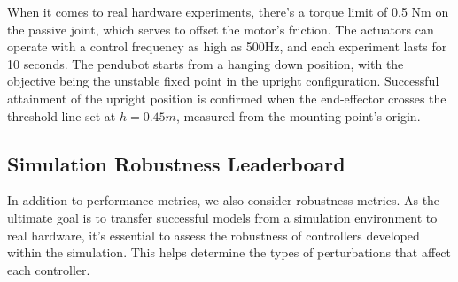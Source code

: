 When it comes to real hardware experiments, there's a torque limit of 0.5 Nm on the passive joint, which serves to offset the motor's friction. The actuators can operate with a control frequency as high as 500Hz, and each experiment lasts for 10 seconds. The pendubot starts from a hanging down position, with the objective being the unstable fixed point in the upright configuration. Successful attainment of the upright position is confirmed when the end-effector crosses the threshold line set at \(h=0.45m\), measured from the mounting point's origin.

\subsection{Simulation Robustness Leaderboard}
In addition to performance metrics, we also consider robustness metrics. As the ultimate goal is to transfer successful models from a simulation environment to real hardware, it's essential to assess the robustness of controllers developed within the simulation. This helps determine the types of perturbations that affect each controller.

